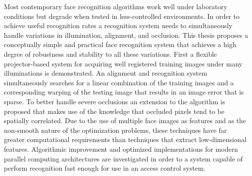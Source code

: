 Most contemporary face recognition algorithms work well under laboratory
conditions but degrade when tested in less-controlled environments. In order to
achieve useful recognition rates a recognition system needs to simultaneously
handle variations in illumination, alignment, and occlusion. This thesis
proposes a conceptually simple and practical face recognition system that
achieves a high degree of robustness and stability to all these variations.
First a flexible projector-based system for acquiring well registered training
images under many illuminations is demonstrated.  An alignment and recognition
system simultaneously searches for a linear combination of the training images
and a corresponding warping of the testing image that results in an image error
that is sparse.  To better handle severe occlusions an extension to the
algorithm is proposed that makes use of the knowledge that occluded pixels tend
to be spatially correlated.  Due to the use of multiple face images as features
and as the non-smooth nature of the optimization problems, these techniques
have far greater computational requirements than techniques that extract
low-dimensional features.  Algorithmic improvement and optimized
implementations for modern parallel computing architectures are investigated in
order to a system capable of perform recognition fast enough for use in an
access control system.  


